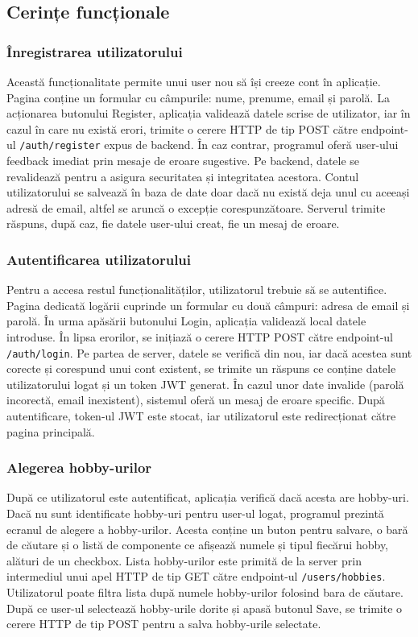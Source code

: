 \subsection{Cerințe funcționale}
\label{subsec:ch4sec2sub1}

\subsubsection*{Înregistrarea utilizatorului}
Această funcționalitate permite unui user nou să își creeze cont în aplicație. 
Pagina conține un formular cu câmpurile: nume, prenume, email și parolă.
La acționarea butonului Register, aplicația validează datele scrise de utilizator, iar în cazul în care
nu există erori, trimite o cerere HTTP de tip POST către endpoint-ul \texttt{/auth/register} expus de backend. 
În caz contrar, programul oferă user-ului feedback imediat prin mesaje de eroare sugestive.
Pe backend, datele se revalidează pentru a asigura securitatea și integritatea acestora. 
Contul utilizatorului se salvează în baza de date doar dacă nu există deja unul cu aceeași adresă de email, altfel se aruncă o excepție corespunzătoare.
Serverul trimite răspuns, după caz, fie datele user-ului creat, fie un mesaj de eroare.

\subsubsection*{Autentificarea utilizatorului}
Pentru a accesa restul funcționalităților, utilizatorul trebuie să se autentifice. Pagina dedicată logării cuprinde un formular cu două câmpuri: adresa de email și parolă.
În urma apăsării butonului Login, aplicația validează local datele introduse. În lipsa erorilor, se inițiază o cerere HTTP POST către endpoint-ul \texttt{/auth/login}.
Pe partea de server, datele se verifică din nou, iar dacă acestea sunt corecte și corespund unui cont existent, se trimite un răspuns ce conține datele utilizatorului logat și un token JWT generat.
În cazul unor date invalide (parolă incorectă, email inexistent), sistemul oferă un mesaj de eroare specific. După autentificare, token-ul JWT este stocat, iar utilizatorul este redirecționat către pagina principală.


\subsubsection*{Alegerea hobby-urilor}
După ce utilizatorul este autentificat, aplicația verifică dacă acesta are hobby-uri. Dacă nu sunt identificate hobby-uri pentru user-ul logat, programul prezintă
ecranul de alegere a hobby-urilor. Acesta conține un buton pentru salvare, o bară de căutare și o listă de componente ce afișează numele și tipul fiecărui hobby, alături de un checkbox.
Lista hobby-urilor este primită de la server prin intermediul unui apel HTTP de tip GET către endpoint-ul \texttt{/users/hobbies}. 
Utilizatorul poate filtra lista după numele hobby-urilor folosind bara de căutare. 
După ce user-ul selectează hobby-urile dorite și apasă butonul Save, se trimite o cerere HTTP de tip POST pentru a salva hobby-urile selectate.

